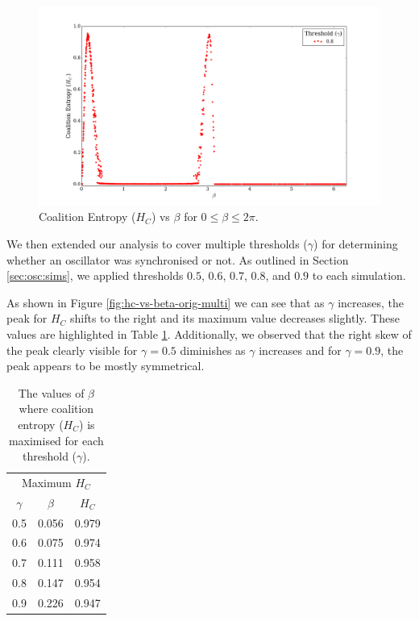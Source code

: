 \documentclass[a4paper,11pt]{article}
\begin{document}
\begin{figure}[H]
\begin{center}
\includegraphics[scale = 0.35]{figures/hc_vs_beta_ext}
\caption{
	Coalition Entropy ($H_C$) vs $\beta$ for $0 \leq \beta \leq 2\pi$.
	\label{fig:hc-vs-beta-ext}
}
\end{center}
\end{figure}

We then extended our analysis to cover multiple thresholds ($\gamma$) for determining whether an oscillator was synchronised or not. As outlined in Section \ref{sec:osc:sims}, we applied thresholds $0.5$, $0.6$, $0.7$, $0.8$, and $0.9$ to each simulation.

As shown in Figure \ref{fig:hc-vs-beta-orig-multi} we can see that as $\gamma$ increases, the peak for $H_C$ shifts to the right and its maximum value decreases slightly. These values are highlighted in Table \ref{tab:max-hc-beta}. Additionally, we observed that the right skew of the peak clearly visible for $\gamma = 0.5$ diminishes as $\gamma$ increases and for $\gamma = 0.9$, the peak appears to be mostly symmetrical.

\begin{table}[ht]
\centering
\begin{tabular}{ c | c c }
\multicolumn{3}{c}{Maximum $H_C$} \\ [2mm]
$\gamma$ & $\beta$ & $H_C$\\
\hline
0.5 & 0.056 & 0.979 \\
0.6 & 0.075 & 0.974 \\
0.7 & 0.111 & 0.958 \\
0.8 & 0.147 & 0.954 \\
0.9 & 0.226 & 0.947 \\
\end{tabular}
\caption{
	The values of $\beta$ where coalition entropy ($H_C$) is maximised for each threshold ($\gamma$).
	\label{tab:max-hc-beta}
}
\end{table}
\end{document}
